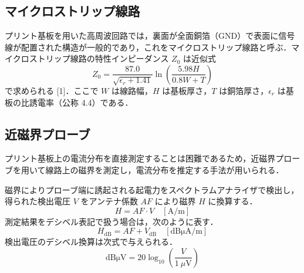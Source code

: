 \documentclass[
  a4paper,  %
  11pt,     %
]{ltjsarticle}
\begin{document}
\subsection{マイクロストリップ線路}
プリント基板を用いた高周波回路では，裏面が全面銅箔（GND）で表面に信号線が配置された構造が一般的であり，これをマイクロストリップ線路と呼ぶ．マイクロストリップ線路の特性インピーダンス $Z_0$ は近似式
\begin{equation}
  Z_0 = \frac{87.0}{\sqrt{\epsilon_r + 1.41}} \ln\left(\frac{5.98H}{0.8W + T}\right)
\end{equation}
で求められる [1]．ここで $W$ は線路幅，$H$ は基板厚さ，$T$ は銅箔厚さ，$\epsilon_r$ は基板の比誘電率（公称 4.4）である．

\subsection{近磁界プローブ}
プリント基板上の電流分布を直接測定することは困難であるため，近磁界プローブを用いて線路上の磁界を測定し，電流分布を推定する手法が用いられる．

磁界によりプローブ端に誘起される起電力をスペクトラムアナライザで検出し，得られた検出電圧 $V$ をアンテナ係数 $AF$ により磁界 $H$ に換算する．
\begin{equation}
  H = AF \cdot V \quad [\mathrm{A/m}]
\end{equation}
測定結果をデシベル表記で扱う場合は，次のように表す．
\begin{equation}
  H_{\mathrm{dB}} = AF + V_{\mathrm{dB}} \quad [\mathrm{dB\mu A/m}]
\end{equation}
検出電圧のデシベル換算は次式で与えられる．
\begin{equation}
  \mathrm{dB\mu V} = 20 \log_{10}\left(\frac{V}{1\ \mu\mathrm{V}}\right)
\end{equation}

\end{document}

